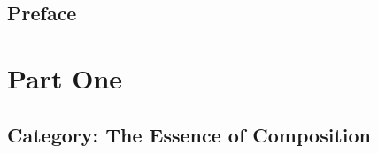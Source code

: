
%
%



\frontmatter



\pagebreak



\pagebreak
\tableofcontents

\chapter*{Preface}
\label{Preface}



\mainmatter

\part*{Part One}

\chapter{Category: The Essence of Composition}\label{category-the-essence-of-composition}



